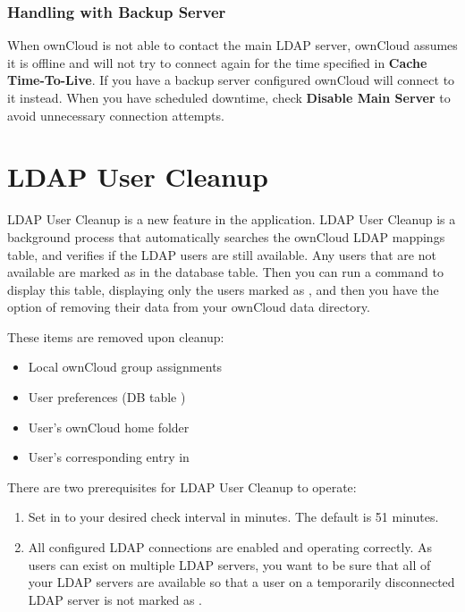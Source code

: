 \documentclass[letterpaper,10pt,english]{sphinxmanual}
\begin{document}
\subsubsection{Handling with Backup Server}
\label{configuration_user/user_auth_ldap:handling-with-backup-server}
When ownCloud is not able to contact the main LDAP server, ownCloud assumes it
is offline and will not try to connect again for the time specified in \textbf{Cache
Time-To-Live}. If you have a backup server configured ownCloud will connect to
it instead. When you have scheduled downtime, check \textbf{Disable Main Server}  to
avoid unnecessary connection attempts.


\section{LDAP User Cleanup}
\label{configuration_user/user_auth_ldap_cleanup:ldap-user-cleanup}\label{configuration_user/user_auth_ldap_cleanup::doc}
LDAP User Cleanup is a new feature in the 
application. LDAP User Cleanup is a background process that automatically
searches the ownCloud LDAP mappings table, and verifies if the LDAP users are
still available. Any users that are not available are marked as  in
the  database table. Then you can run a command to display
this table, displaying only the users marked as , and then you have
the option of removing their data from your ownCloud data directory.

These items are removed upon cleanup:
\begin{itemize}
\item {} 
Local ownCloud group assignments

\item {} 
User preferences (DB table )

\item {} 
User's ownCloud home folder

\item {} 
User's corresponding entry in 

\end{itemize}

There are two prerequisites for LDAP User Cleanup to operate:
\begin{enumerate}
\item {} 
Set  in  to your desired check
interval in minutes. The default is 51 minutes.

\item {} 
All configured LDAP connections are enabled and operating correctly. As users
can exist on multiple LDAP servers, you want to be sure that all of your
LDAP servers are available so that a user on a temporarily disconnected LDAP
server is not marked as .

\end{enumerate}
\end{document}
